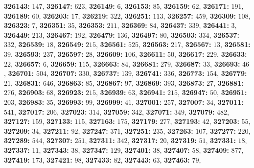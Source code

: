 \textsf{\bfseries 326143:} $147$, \textsf{\bfseries 326147:} $623$, \textsf{\bfseries 326149:} $6$, \textsf{\bfseries 326153:} $85$, \textsf{\bfseries 326159:} $62$, \textsf{\bfseries 326171:} $191$, \textsf{\bfseries 326189:} $60$, \textsf{\bfseries 326203:} $17$, \textsf{\bfseries 326219:} $322$, \textsf{\bfseries 326251:} $113$, \textsf{\bfseries 326257:} $459$, \textsf{\bfseries 326309:} $108$, \textsf{\bfseries 326323:} $7$, \textsf{\bfseries 326351:} $35$, \textsf{\bfseries 326353:} $211$, \textsf{\bfseries 326369:} $84$, \textsf{\bfseries 326437:} $339$, \textsf{\bfseries 326441:} $3$, \textsf{\bfseries 326449:} $213$, \textsf{\bfseries 326467:} $192$, \textsf{\bfseries 326479:} $136$, \textsf{\bfseries 326497:} $80$, \textsf{\bfseries 326503:} $334$, \textsf{\bfseries 326537:} $332$, \textsf{\bfseries 326539:} $18$, \textsf{\bfseries 326549:} $215$, \textsf{\bfseries 326561:} $525$, \textsf{\bfseries 326563:} $217$, \textsf{\bfseries 326567:} $13$, \textsf{\bfseries 326581:} $39$, \textsf{\bfseries 326593:} $237$, \textsf{\bfseries 326597:} $28$, \textsf{\bfseries 326609:} $106$, \textsf{\bfseries 326611:} $50$, \textsf{\bfseries 326617:} $229$, \textsf{\bfseries 326633:} $22$, \textsf{\bfseries 326657:} $6$, \textsf{\bfseries 326659:} $115$, \textsf{\bfseries 326663:} $84$, \textsf{\bfseries 326681:} $279$, \textsf{\bfseries 326687:} $33$, \textsf{\bfseries 326693:} $46$, \textsf{\bfseries 326701:} $504$, \textsf{\bfseries 326707:} $330$, \textsf{\bfseries 326737:} $139$, \textsf{\bfseries 326741:} $336$, \textsf{\bfseries 326773:} $154$, \textsf{\bfseries 326779:} $21$, \textsf{\bfseries 326831:} $646$, \textsf{\bfseries 326863:} $85$, \textsf{\bfseries 326867:} $97$, \textsf{\bfseries 326869:} $393$, \textsf{\bfseries 326873:} $27$, \textsf{\bfseries 326881:} $276$, \textsf{\bfseries 326903:} $68$, \textsf{\bfseries 326923:} $215$, \textsf{\bfseries 326939:} $63$, \textsf{\bfseries 326941:} $215$, \textsf{\bfseries 326947:} $50$, \textsf{\bfseries 326951:} $203$, \textsf{\bfseries 326983:} $35$, \textsf{\bfseries 326993:} $99$, \textsf{\bfseries 326999:} $41$, \textsf{\bfseries 327001:} $257$, \textsf{\bfseries 327007:} $34$, \textsf{\bfseries 327011:} $541$, \textsf{\bfseries 327017:} $206$, \textsf{\bfseries 327023:} $314$, \textsf{\bfseries 327059:} $342$, \textsf{\bfseries 327071:} $349$, \textsf{\bfseries 327079:} $482$, \textsf{\bfseries 327127:} $159$, \textsf{\bfseries 327133:} $115$, \textsf{\bfseries 327163:} $175$, \textsf{\bfseries 327179:} $277$, \textsf{\bfseries 327193:} $42$, \textsf{\bfseries 327203:} $55$, \textsf{\bfseries 327209:} $34$, \textsf{\bfseries 327211:} $92$, \textsf{\bfseries 327247:} $371$, \textsf{\bfseries 327251:} $235$, \textsf{\bfseries 327263:} $107$, \textsf{\bfseries 327277:} $220$, \textsf{\bfseries 327289:} $544$, \textsf{\bfseries 327307:} $251$, \textsf{\bfseries 327311:} $342$, \textsf{\bfseries 327317:} $20$, \textsf{\bfseries 327319:} $51$, \textsf{\bfseries 327331:} $18$, \textsf{\bfseries 327337:} $11$, \textsf{\bfseries 327343:} $38$, \textsf{\bfseries 327347:} $129$, \textsf{\bfseries 327401:} $38$, \textsf{\bfseries 327407:} $58$, \textsf{\bfseries 327409:} $877$, \textsf{\bfseries 327419:} $173$, \textsf{\bfseries 327421:} $98$, \textsf{\bfseries 327433:} $82$, \textsf{\bfseries 327443:} $63$, \textsf{\bfseries 327463:} $79$, 
